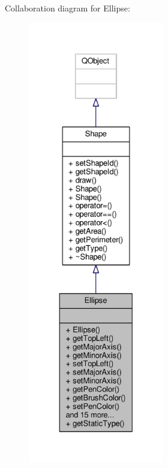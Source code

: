 Collaboration diagram for Ellipse\+:\nopagebreak
\begin{figure}[H]
\begin{center}
\leavevmode
\includegraphics[height=550pt]{classEllipse__coll__graph}
\end{center}
\end{figure}
